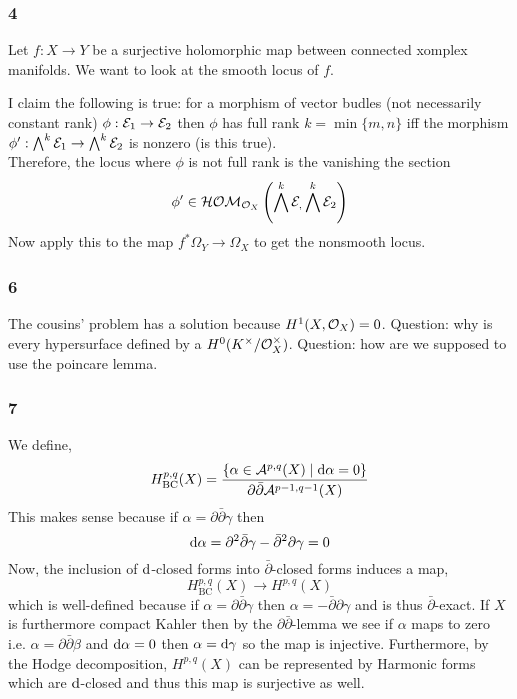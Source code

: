 \documentclass[12pt]{article}
\begin{document}
\subsubsection{4}


Let $f : X \to Y$ be a surjective holomorphic map between connected xomplex manifolds. We want to look at the smooth locus of $f$.

I claim the following is true: for a morphism of vector budles (not necessarily constant rank) $\phi : \mathcal{E}_1 \to \mathcal{E}_2$ then $\phi$ has full rank $k = \min{\{m, n \}}$ iff the morphism $\phi' : \bigwedge^k \mathcal{E}_1 \to \bigwedge^k \mathcal{E}_2$ is nonzero (is this true).
\bigskip\\
Therefore, the locus where $\phi$ is not full rank is the vanishing the section
\[ \phi' \in \mathcal{HOM}_{\mathcal{O}_{X}}\left(\bigwedge^k \mathcal{E}_, \bigwedge^k \mathcal{E}_2\right) \]
Now apply this to the map $f^* \Omega_Y \to \Omega_X$ to get the nonsmooth 
locus.

\subsubsection{6}

The cousins' problem has a solution because $H^1(X, \mathcal{O}_{X}) = 0$. Question: why is every hypersurface defined by a $H^0(K^\times / \mathcal{O}_{X}^\times)$. Question: how are we supposed to use the poincare lemma.

\subsubsection{7}

\renewcommand{\A}{\mathcal{A}}

We define,
\[ H^{p,q}_{\mathrm{BC}}(X) = \frac{\{ \alpha \in \A^{p,q}(X) \mid \d{\alpha} = 0 \}}{ \partial \bar{\partial} \A^{p-1,q-1}(X)} \] 
This makes sense because if $\alpha = \partial \bar{\partial} \gamma$ then \[ \mathrm{d}{\alpha} = \partial^2 \bar{\partial} \gamma - \bar{\partial}^2 \partial \gamma = 0 \]
Now, the inclusion of $\mathrm{d}{}$-closed forms into $\bar{\partial}$-closed forms induces a map,
\[ H^{p,q}_{\mathrm{BC}}(X) \to H^{p,q}(X) \]
which is well-defined because if $\alpha = \partial \bar{\partial} \gamma$ then $\alpha = - \bar{\partial} \partial \gamma$ and is thus $\bar{\partial}$-exact. If $X$ is furthermore compact Kahler then by the $\partial \bar{\partial}$-lemma we see if $\alpha$ maps to zero i.e. $\alpha = \partial \bar{\partial} \beta$ and $\mathrm{d}{\alpha} = 0$ then $\alpha = \mathrm{d}{\gamma}$ so the map is injective. Furthermore, by the Hodge decomposition, $H^{p,q}(X)$ can be represented by Harmonic forms which are $\mathrm{d}$-closed and thus this map is surjective as well.
\end{document}
